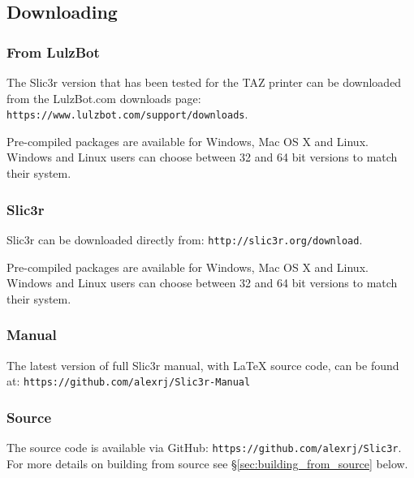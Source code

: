 

\subsection{Downloading}

\subsubsection{From LulzBot} %
\label{sub:from_LulzBot}
The Slic3r version that has been tested for the TAZ printer can be downloaded from the LulzBot.com downloads page: \texttt{https://www.lulzbot.com/support/downloads}.

Pre-compiled packages are available for Windows, Mac OS X and Linux.  Windows and Linux users can choose between 32 and 64 bit versions to match their system.

\subsubsection{Slic3r} %
\label{sub:slic3r}
Slic3r can be downloaded directly from: \texttt{http://slic3r.org/download}.

Pre-compiled packages are available for Windows, Mac OS X and Linux.  Windows and Linux users can choose between 32 and 64 bit versions to match their system.

\subsubsection{Manual} %
\label{sub:manual}

The latest version of full Slic3r manual, with {\LaTeX} source code, can be found at: \texttt{https://github.com/alexrj/Slic3r-Manual}


\subsubsection{Source} %
\label{sub:source}

The source code is available via GitHub: \texttt{https://github.com/alexrj/Slic3r}. For more details on building from source see §\ref{sec:building_from_source} below.

